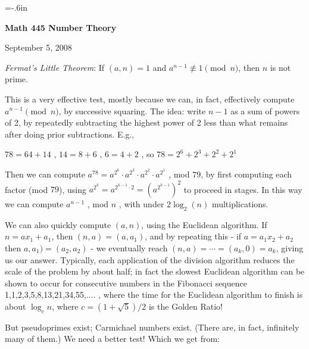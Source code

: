 




\nopagenumbers
\parindent=-20pt
\voffset=-.6in


\def\ctln{\centerline}
\def\u{\underbar}


\ctln{\bf Math 445 Number Theory}

\medskip

\ctln{September 5, 2008}

\bigskip

{\it Fermat's Little Theorem}: If $(a,n)=1$ and 
$a^{n-1}\not\equiv 1 \pmod{n}$, then $n$ is not prime.

\medskip

This is a very effective test, mostly because we can, in fact,
effectively compute $a^{n-1} \pmod{n}$, by successive squaring.
The idea: write $n-1$ as a sum of powers of 2, by repeatedly 
subtracting the highest power of 2 less than what remains
after doing prior subtractions. E.g.,

\smallskip

$78 = 64+14$ , $14=8+6$ , $6=4+2$ , so $78 = 2^6+2^3+2^2+2^1$ 

\smallskip

Then we can compute $a^{78}=a^{2^6}\cdot a^{2^3}\cdot a^{2^2}\cdot a^{2^1}$ , mod $79$, 
by first computing each factor (mod $79$), using $a^{2^k}=a^{2^{k-1}\cdot 2}=(a^{2^{k-1}})^2$
to proceed in stages. In this way we can compute $a^{n-1}$ , mod $n$ , with under $2\log_2(n)$
multiplications.


\medskip

We can also quickly compute $(a,n)$, using the Euclidean algorithm. If $n=ax_1+a_1$, then $(n,a)=(a,a_1)$,
and by repeating this - if $a=a_1x_2+a_2$ then $a,a_1)=(a_2,a_2)$ - we eventually reach
$(n,a)=\cdots = (a_k,0)=a_k$, giving us our answer. Typically, each application of the
division algorithm reduces the scale of the problem by about half; in fact the
slowest Euclidean algorithm can be shown to occur for consecutive numbers in the
Fibonacci sequence 1,1,2,3,5,8,13,21,34,55,.... , where the time for the Euclidean
algorithm to finish is about $\log_c n$, where $c=(1+\sqrt{5})/2$ is the Golden Ratio!

\medskip

But pseudoprimes exist; Carmichael numbers exist. (There are, in fact, infinitely many of them.)
We need a better test! Which we get from:

\medskip

